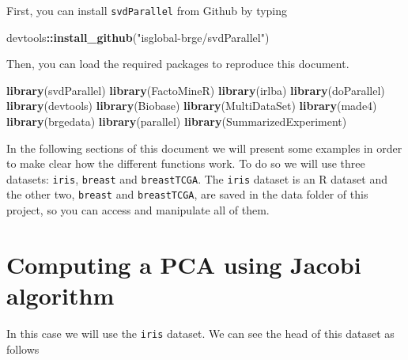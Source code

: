 \documentclass[]{article}
\newenvironment{Shaded}{\begin{snugshade}}{\end{snugshade}}
\newcommand{\KeywordTok}[1]{\textcolor[rgb]{0.13,0.29,0.53}{\textbf{#1}}}
\newcommand{\StringTok}[1]{\textcolor[rgb]{0.31,0.60,0.02}{#1}}
\newcommand{\OperatorTok}[1]{\textcolor[rgb]{0.81,0.36,0.00}{\textbf{#1}}}
\newcommand{\NormalTok}[1]{#1}
\begin{document}
First, you can install \texttt{svdParallel} from Github by typing

\begin{Shaded}
\begin{Highlighting}[]
\NormalTok{devtools}\OperatorTok{::}\KeywordTok{install_github}\NormalTok{(}\StringTok{"isglobal-brge/svdParallel"}\NormalTok{)}
\end{Highlighting}
\end{Shaded}

Then, you can load the required packages to reproduce this document.

\begin{Shaded}
\begin{Highlighting}[]
\KeywordTok{library}\NormalTok{(svdParallel)}
\KeywordTok{library}\NormalTok{(FactoMineR)}
\KeywordTok{library}\NormalTok{(irlba)}
\KeywordTok{library}\NormalTok{(doParallel)}
\KeywordTok{library}\NormalTok{(devtools)}
\KeywordTok{library}\NormalTok{(Biobase)}
\KeywordTok{library}\NormalTok{(MultiDataSet)}
\KeywordTok{library}\NormalTok{(made4)}
\KeywordTok{library}\NormalTok{(brgedata)}
\KeywordTok{library}\NormalTok{(parallel)}
\KeywordTok{library}\NormalTok{(SummarizedExperiment)}
\end{Highlighting}
\end{Shaded}

In the following sections of this document we will present some examples
in order to make clear how the different functions work. To do so we
will use three datasets: \texttt{iris}, \texttt{breast} and
\texttt{breastTCGA}. The \texttt{iris} dataset is an R dataset and the
other two, \texttt{breast} and \texttt{breastTCGA}, are saved in the
data folder of this project, so you can access and manipulate all of
them.

\section{Computing a PCA using Jacobi
algorithm}\label{computing-a-pca-using-jacobi-algorithm}

In this case we will use the \texttt{iris} dataset. We can see the head
of this dataset as follows
\end{document}
